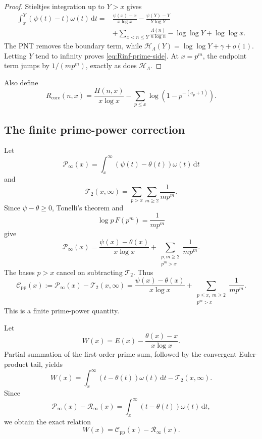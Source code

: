 \documentclass[11pt,a4paper]{article}
\numberwithin{equation}{section}
\theoremstyle{definition}
\newcommand{\dd}{\,\mathrm{d}}
\newcommand{\Rinf}{\mathcal R_{\infty}}
\newcommand{\Cpi}{\mathcal C_{\mathrm{pp}}}
\begin{document}
\begin{proof}
Stieltjes integration up to \(Y>x\) gives
\begin{align*}
  \int_x^Y(\psi(t)-t)\omega(t)\dd t
  ={}&\frac{\psi(x)-x}{x\log x}
  -\frac{\psi(Y)-Y}{Y\log Y}\\
  &+\sum_{x<n\le Y}\frac{\Lambda(n)}{n\log n}
  -\log\log Y+\log\log x.
\end{align*}
The PNT removes the boundary term, while
  \(\mathcal H_\Lambda(Y)=\log\log Y+\gamma+o(1)\).  Letting \(Y\) tend to
infinity proves \eqref{eq:Rinf-prime-side}.  At \(x=p^m\), the endpoint term
jumps by \(1/(mp^m)\), exactly as does \(\mathcal H_\Lambda\).
\end{proof}

Also define
\begin{equation}\label{eq:Rcore-def}
  R_{\mathrm{core}}(n,x)
  =
  \frac{H(n,x)}{x\log x}
  -\sum_{p\le x}\log\left(1-p^{-(a_p+1)}\right).
\end{equation}

\subsection{The finite prime-power correction}

Let
\[
  \mathcal P_\infty(x)
  =
  \int_x^\infty(\psi(t)-\theta(t))\omega(t)\dd t
\]
and
\[
  \mathcal T_2(x,\infty)
  =
  \sum_{p>x}\sum_{m\ge2}\frac1{mp^m}.
\]
Since \(\psi-\theta\ge0\), Tonelli's theorem and
\[
  \log p\,F(p^m)=\frac1{mp^m}
\]
give
\[
  \mathcal P_\infty(x)
  =
  \frac{\psi(x)-\theta(x)}{x\log x}
  +
  \sum_{\substack{p,m\ge2\\p^m>x}}\frac1{mp^m}.
\]
The bases \(p>x\) cancel on subtracting \(\mathcal T_2\).  Thus
\begin{equation}\label{eq:Cpp-def}
  \Cpi(x)
  :=
  \mathcal P_\infty(x)-\mathcal T_2(x,\infty)
  =
  \frac{\psi(x)-\theta(x)}{x\log x}
  +
  \sum_{\substack{p\le x,\ m\ge2\\p^m>x}}\frac1{mp^m}.
\end{equation}
This is a finite prime-power quantity.

Let
\[
  W(x)
  =
  E(x)-\frac{\theta(x)-x}{x\log x}.
\]
Partial summation of the first-order prime sum, followed by the convergent
Euler-product tail, yields
\[
  W(x)
  =
  \int_x^\infty(t-\theta(t))\omega(t)\dd t
  -\mathcal T_2(x,\infty).
\]
Since
\[
  \mathcal P_\infty(x)-\Rinf(x)
  =
  \int_x^\infty(t-\theta(t))\omega(t)\dd t,
\]
we obtain the exact relation
\begin{equation}\label{eq:W-C-R}
  W(x)=\Cpi(x)-\Rinf(x).
\end{equation}
\end{document}
